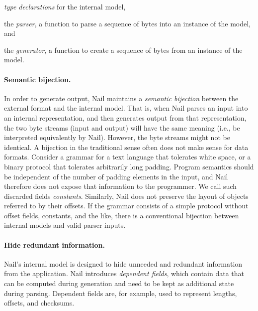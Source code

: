 \begin{CompactItemize}
\item \textit{type declarations} for the internal model,
\item the \textit{parser}, a function to parse a sequence of bytes into an
instance of the model, and
\item the \textit{generator}, a function to create a
sequence of bytes from an instance of the model.
\end{CompactItemize}

\noindent

\paragraph{Semantic bijection.}

In order to generate output, Nail maintains
a \emph{semantic bijection} between the external format and the internal model.
That is, when Nail parses an input into an internal representation, and then
generates output from that representation, the two byte streams (input and
output) will have the same meaning (i.e., be interpreted equivalently by Nail).
However, the byte streams might not be identical.
A bijection in the traditional sense often does not make sense for data
formats. Consider a grammar for a text language that tolerates white space, or a binary protocol
that tolerates arbitrarily long padding.
 Program semantics should be independent of the number of padding elements in the input, and Nail therefore
does not expose that information to the programmer. We call such discarded fields \emph{constants}.
Similarly, Nail does not preserve the layout of objects referred to by their offsets. If the grammar
consists of a simple protocol without offset fields, constants, and the like, there is a conventional
bijection between  internal models and valid parser inputs.

\paragraph{Hide redundant information.}
Nail's internal model is designed to hide unneeded and redundant information from the application.
Nail introduces \emph{dependent fields}, which contain data that can be computed during generation
and need to be kept as additional state during parsing. Dependent fields are, for example, used to represent
lengths, offsets, and checksums.

